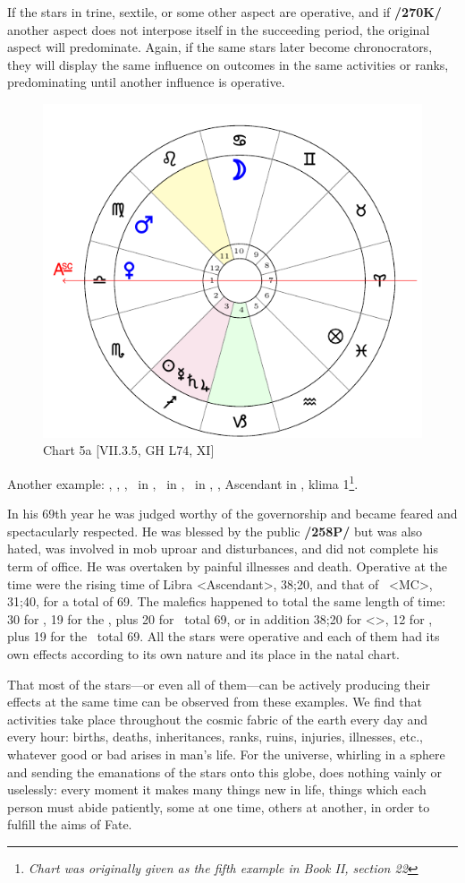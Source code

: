 If \mndl the stars in trine, sextile, or some other aspect are operative, and if \textbf{/270K/} another aspect does not interpose itself in the succeeding period, the original aspect will predominate. Again, if the same stars later become chronocrators, they will display the same influence on outcomes in the same activities or ranks, predominating until another influence is operative.

\newpage
\begin{figure}
\centering
\includegraphics[width=.68\textwidth]{charts/2_21_5}
\caption{Chart 5a [VII.3.5, GH L74, XI]}
\label{fig:chart5a}
\end{figure} 

Another example: \Sun, \Saturn, \Jupiter, \Mercury\, in \Sagittarius, \Moon\, in \Cancer, \Mars\, in \Virgo,
\Venus, Ascendant in \Libra, klima 1\footnote{\textit{Chart was originally given as the fifth example in Book II, section 22}}.

In his 69th year he was judged worthy of the governorship and became feared and spectacularly respected. He was blessed by the public \textbf{/258P/} but was also hated, was involved in mob uproar and disturbances, and did not complete his term of office. He was overtaken by painful illnesses and death. Operative at the time were the rising time of Libra <Ascendant>, 38;20, and
that of \Cancer\, <MC>, 31;40, for a total of 69. The malefics happened to total the same length of time: 30 for \Saturn, 19 for the \Sun, plus 20 for \Mercury\, total 69, or in addition 38;20 for \Virgo <\Mars>, 12 for \Jupiter, plus 19 for the \Sun\, total 69. All the stars were operative and each of them had its own effects according to its own nature and its place in the natal chart.

That most of the stars—or even all of them—can be actively producing their effects at the same time can be observed from these examples. We find that activities take place throughout the cosmic fabric of the
earth every day and every hour: births, deaths, inheritances, ranks, ruins, injuries, illnesses, etc., whatever good or bad arises in man’s life. For the universe, whirling in a sphere and sending the emanations of the stars onto this globe, does nothing vainly or uselessly: every moment it makes many things new in life, things which each person must abide patiently, some at one time, others at another, in order to fulfill the aims of Fate.

